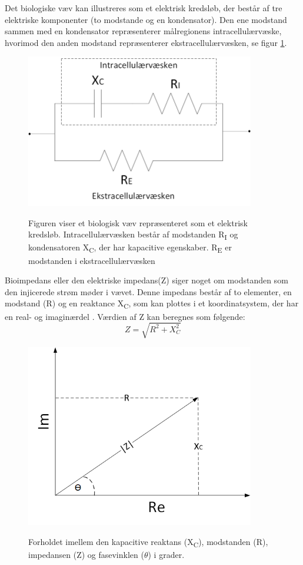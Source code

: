 Det biologiske væv kan illustreres som et elektrisk kredsløb, der består af tre elektriske komponenter (to modstande og en kondensator). Den ene modstand sammen med en kondensator repræsenterer målregionens intracellulærvæske, hvorimod den anden modstand repræsenterer ekstracellulærvæsken, se figur \ref{fig:vaevsmodel}.

\begin{figure}[H]
\centering
{\includegraphics[width=10cm]
{Figure/vaevsmodel}}
\caption{Figuren viser et biologisk væv repræsenteret som et elektrisk kredsløb. Intracellulærvæsken består af modstanden  R\textsubscript{I} og kondensatoren X\textsubscript{C}, der har kapacitive egenskaber. R\textsubscript{E} er modstanden i ekstracellulærvæsken}
\label{fig:vaevsmodel}
\end{figure}

\pagebreak


Bioimpedans eller den elektriske impedans(Z) siger noget om modstanden som den injicerede strøm møder i vævet. Denne impedans består af to elementer, en modstand (R) og en reaktance X\textsubscript{C}, som kan plottes i et koordinatsystem, der har en real- og imaginærdel \citep{Aroom2009}. Værdien af Z kan beregnes som følgende: 
\begin{equation}
Z=\sqrt{R^{2}+X^{2}_{C}}
\end{equation} 

\begin{figure}[H]
\centering
{\includegraphics[width=10cm]
{Figure/vektor}}
\caption{Forholdet imellem den kapacitive reaktans (X\textsubscript{C}), modstanden (R), impedansen (Z) og fasevinklen ($\theta$) i grader.}
\label{fig:vektor}
\end{figure}


